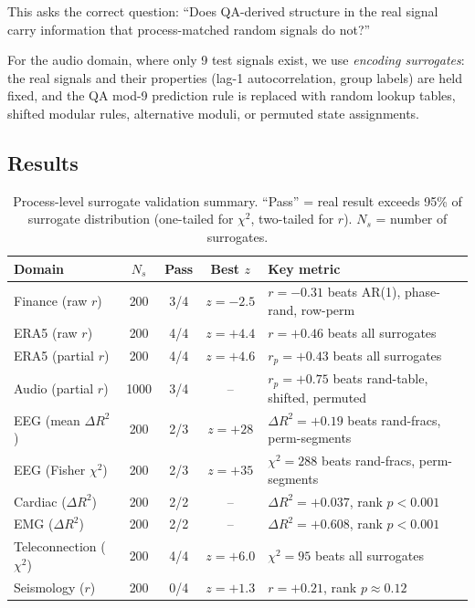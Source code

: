 \documentclass[11pt,a4paper]{article}
\begin{document}
This asks the correct question: ``Does QA-derived structure in the real
signal carry information that process-matched random signals do not?''

For the audio domain, where only 9 test signals exist, we use
\emph{encoding surrogates}: the real signals and their properties (lag-1
autocorrelation, group labels) are held fixed, and the QA mod-9 prediction
rule is replaced with random lookup tables, shifted modular rules,
alternative moduli, or permuted state assignments.

\subsection{Results}

\begin{table}[h]
\centering
\caption{Process-level surrogate validation summary. ``Pass'' = real result
  exceeds 95\% of surrogate distribution (one-tailed for $\chi^2$,
  two-tailed for $r$). $N_s$ = number of surrogates.}
\begin{tabular}{lcccl}
\toprule
Domain & $N_s$ & Pass & Best $z$ & Key metric \\
\midrule
Finance (raw $r$) & 200 & 3/4 & $z = -2.5$ & $r = -0.31$ beats AR(1), phase-rand, row-perm \\
ERA5 (raw $r$) & 200 & 4/4 & $z = +4.4$ & $r = +0.46$ beats all surrogates \\
ERA5 (partial $r$) & 200 & 4/4 & $z = +4.6$ & $r_p = +0.43$ beats all surrogates \\
Audio (partial $r$) & 1000 & 3/4 & -- & $r_p = +0.75$ beats rand-table, shifted, permuted \\
EEG (mean $\Delta R^2$) & 200 & 2/3 & $z = +28$ & $\Delta R^2 = +0.19$ beats rand-fracs, perm-segments \\
EEG (Fisher $\chi^2$) & 200 & 2/3 & $z = +35$ & $\chi^2 = 288$ beats rand-fracs, perm-segments \\
Cardiac ($\Delta R^2$) & 200 & 2/2 & -- & $\Delta R^2 = +0.037$, rank $p < 0.001$ \\
EMG ($\Delta R^2$) & 200 & 2/2 & -- & $\Delta R^2 = +0.608$, rank $p < 0.001$ \\
Teleconnection ($\chi^2$) & 200 & 4/4 & $z = +6.0$ & $\chi^2 = 95$ beats all surrogates \\
Seismology ($r$) & 200 & 0/4 & $z = +1.3$ & $r = +0.21$, rank $p \approx 0.12$ \\
\bottomrule
\end{tabular}
\end{table}
\end{document}
